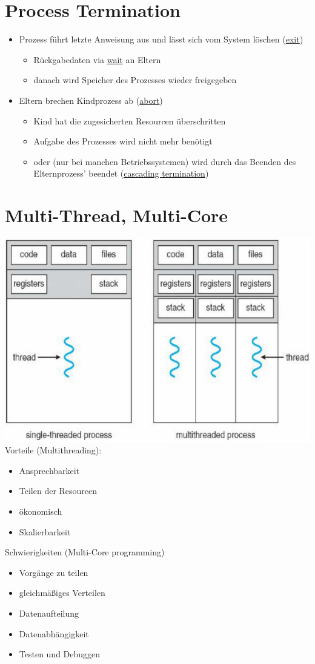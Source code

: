 \documentclass[a4paper]{scrreprt}
\begin{document}
\section{Process Termination}
	\begin{itemize}
		\item Prozess führt letzte Anweisung aus und lässt sich vom System löschen (\underline{exit})
		\begin{itemize}
			\item Rückgabedaten via \underline{wait} an Eltern
			\item danach wird Speicher des Prozesses wieder freigegeben
		\end{itemize}
		\item Eltern brechen Kindprozess ab (\underline{abort})
		\begin{itemize}
			\item Kind hat die zugesicherten Resourcen überschritten
			\item Aufgabe des Prozesses wird nicht mehr benötigt
			\item oder (nur bei manchen Betriebssystemen) wird durch das Beenden des Elternprozess' beendet (\underline{cascading termination})
		\end{itemize}
	\end{itemize}

\section{Multi-Thread, Multi-Core}
	\includegraphics[scale = 0.4]{graphics/threads.png}\\
	Vorteile (Multithreading):
	\begin{itemize}
		\item Ansprechbarkeit
		\item Teilen der Resourcen
		\item ökonomisch
		\item Skalierbarkeit
	\end{itemize}
	Schwierigkeiten (Multi-Core programming)
	\begin{itemize}
		\item Vorgänge zu teilen
		\item gleichmäßiges Verteilen
		\item Datenaufteilung
		\item Datenabhängigkeit
		\item Testen und Debuggen
	\end{itemize}
\end{document}
